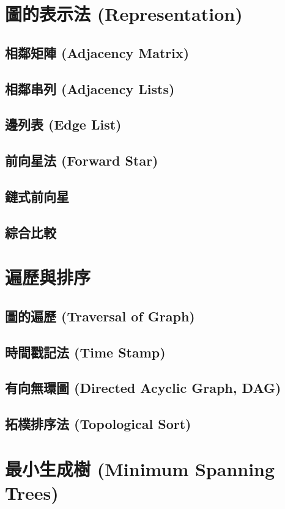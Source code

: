 \documentclass[12pt,a4paper,oneside]{report}
\begin{document}
\begin{CJK}{UTF8}{bkai}
\section{圖的表示法 (Representation)}
\subsection{相鄰矩陣 (Adjacency Matrix)}
\subsection{相鄰串列 (Adjacency Lists)}
\subsection{邊列表 (Edge List)}
\subsection{前向星法 (Forward Star)}
\subsection{鏈式前向星}
\subsection{綜合比較}

\section{遍歷與排序}
\subsection{圖的遍歷 (Traversal of Graph)}
\subsection{時間戳記法 (Time Stamp)}
\subsection{有向無環圖 (Directed Acyclic Graph, DAG)}
\subsection{拓樸排序法 (Topological Sort)}

\section{最小生成樹 (Minimum Spanning Trees)}

\end{CJK}
\end{document}

